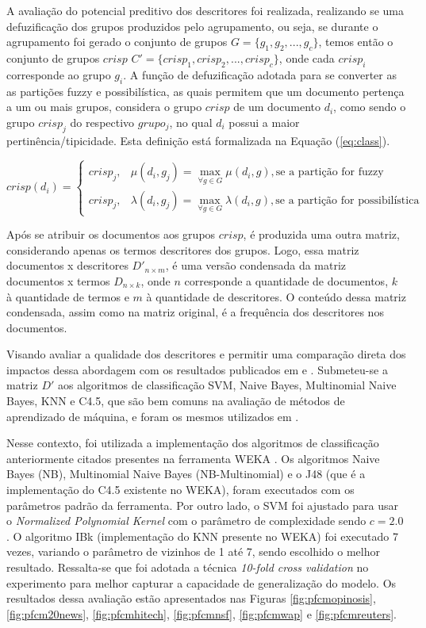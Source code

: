 A avaliação do potencial preditivo dos descritores foi realizada, realizando se uma defuzificação
dos grupos produzidos pelo agrupamento, ou seja, se durante o agrupamento foi gerado o conjunto
de grupos $G = \{g_1,g_2,...,g_c\}$, temos então o conjunto de grupos $crisp$ $C' =
\{crisp_1,crisp_2,...,crisp_c\}$, onde cada $crisp_i$ corresponde ao grupo $g_i$. A função de
defuzificação adotada para se converter as
as partições fuzzy e possibilística, as quais permitem que um documento pertença a um ou mais
grupos, considera o grupo $crisp$ de um documento $d_i$, como sendo o grupo $crisp_j$ do respectivo
$grupo_j$, no qual $d_i$ possui a maior
pertinência/tipicidade. Esta definição está formalizada na Equação (\ref{eq:class}).

\begin{equation}
  crisp(d_i) = \begin{cases}
    crisp_j, & \mu(d_i,g_j) = \displaystyle\max_{\forall g \in G} \mu(d_i,g), \text{se a partição
  for fuzzy}\\
  crisp_j, & \lambda(d_i,g_j) = \displaystyle\max_{\forall g \in G} \lambda(d_i,g), \text{se a
  partição for possibilística}
  \end{cases}
  \label{eq:class}
\end{equation}

Após se atribuir os documentos aos grupos $crisp$, é produzida uma outra matriz,
considerando apenas os termos descritores dos grupos. Logo, essa matriz documentos x descritores
$D'_{n \times m}$, 
é uma versão condensada da matriz documentos x termos $D_{n \times k}$, onde $n$ corresponde a 
quantidade de documentos, $k$ à quantidade de termos e $m$ à quantidade de descritores. O conteúdo
dessa matriz condensada, assim como na matriz original, é a frequência dos descritores nos 
documentos. 

Visando avaliar a qualidade dos descritores e permitir uma comparação direta dos impactos
dessa abordagem com os resultados publicados em  e
. Submeteu-se a matriz $D'$ 
aos algoritmos de classificação 
SVM, Naive Bayes, Multinomial Naive Bayes, KNN e C4.5, que são bem comuns na avaliação de 
métodos de aprendizado de máquina, e foram os mesmos utilizados em .

Nesse contexto, foi utilizada a implementação dos algoritmos de classificação anteriormente citados
presentes na ferramenta WEKA \cite{weka}. Os algoritmos Naive Bayes (NB), Multinomial Naive Bayes
(NB-Multinomial) e o J48 (que é a implementação do C4.5 existente no WEKA), foram executados com os
parâmetros padrão da ferramenta. Por outro lado, o SVM foi ajustado para usar o {\it Normalized
Polynomial Kernel\/} com o parâmetro de complexidade sendo $c = 2.0$. O algoritmo IBk (implementação
do KNN presente no WEKA) foi executado 7 vezes, variando o parâmetro de vizinhos de 1 até 7, sendo
escolhido o melhor resultado. Ressalta-se que foi adotada a técnica {\it 10-fold cross validation\/}
no experimento para melhor capturar a capacidade de generalização do modelo. Os resultados dessa
avaliação estão apresentados nas Figuras \ref{fig:pfcmopinosis},  \ref{fig:pfcm20news},
\ref{fig:pfcmhitech}, \ref{fig:pfcmnsf}, \ref{fig:pfcmwap} e \ref{fig:pfcmreuters}. 

